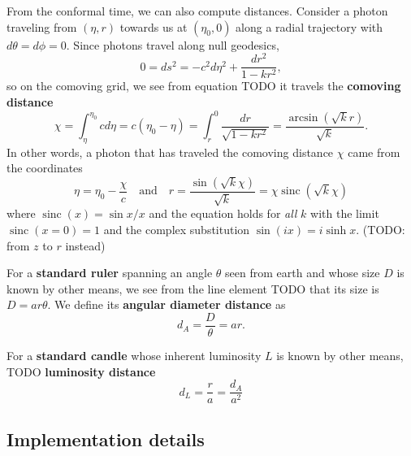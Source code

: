 \documentclass{aa}
\DeclareMathOperator{\sinc}{sinc}
\begin{document}
From the conformal time, we can also compute distances.
Consider a photon traveling from $(\eta, r)$ towards us at $(\eta_0, 0)$ along a radial trajectory with $d\theta = d\phi = 0$.
Since photons travel along null geodesics,
\begin{equation*}
	0 = ds^2 = -c^2 d\eta^2 + \frac{dr^2}{1-kr^2},
\end{equation*}
so on the comoving grid, we see from equation TODO it travels the \textbf{comoving distance}
\begin{equation}
	\chi = \int_{\eta}^{\eta_0} c d\eta = c(\eta_0 - \eta) = \int_r^0 \frac{dr}{\sqrt{1-kr^2}} = \frac{\arcsin(\sqrt{k}r)}{\sqrt{k}}.
\label{eq_comoving_distance}
\end{equation}
In other words, a photon that has traveled the comoving distance $\chi$ came from the coordinates
\begin{equation*}
	\eta = \eta_0 - \frac{\chi}{c}
	\quad \text{and} \quad
	r = \frac{\sin(\sqrt{k}\chi)}{\sqrt{k}} = \chi \sinc(\sqrt{k}\chi)
\end{equation*}
where $\sinc(x) = \sin x / x$ and the equation holds for \emph{all} $k$ with the limit $\sinc(x=0)=1$ and the complex substitution $\sin(ix) = i \sinh x$.
(TODO: from $z$ to $r$ instead)

For a \textbf{standard ruler} spanning an angle $\theta$ seen from earth and whose size $D$ is known by other means,
we see from the line element TODO that its size is $D = a r \theta$.
We define its \textbf{angular diameter distance} as
\begin{equation}
	d_A = \frac{D}{\theta} = a r.
\label{eq_distance_angular}
\end{equation}

For a \textbf{standard candle} whose inherent luminosity $L$ is known by other means, TODO
\textbf{luminosity distance}
\begin{equation}
	d_L = \frac{r}{a} = \frac{d_A}{a^2}
\label{eq_distance_luminosity}
\end{equation}

\subsection{Implementation details}
\end{document}
